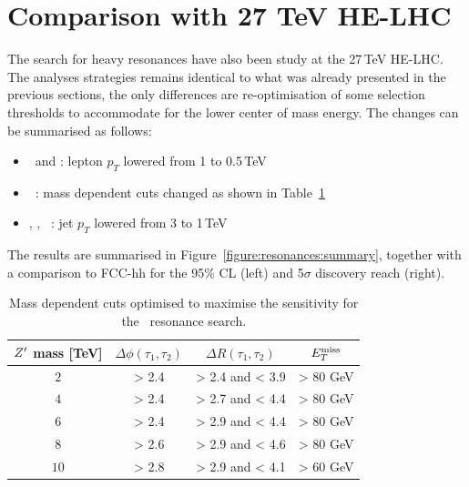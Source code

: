 \documentclass[a4paper,11pt]{article}
\begin{document}
\section{Comparison with 27 TeV HE-LHC}
\label{sec:ana27tev}
The search for heavy resonances have also been study at the 27\,TeV HE-LHC. The analyses strategies remains identical to what was already presented in the previous sections, the only differences are re-optimisation of some selection thresholds to accommodate for the lower center of mass energy. The changes can be summarised as follows:
\begin{itemize}
\item \Zpee\ and \Zpmumu : lepton $p_T$ lowered from 1 to 0.5\,TeV
\item \Zptata\ : mass dependent cuts changed as shown in Table~\ref{tab:leptonicresonances:tautau27}
\item \rsg, \Zptt, \qjj\ : jet $p_T$ lowered from 3 to 1\,TeV
\end{itemize}
The results are summarised in Figure~\ref{figure:resonances:summary}, together with a comparison to FCC-hh for the 95\% CL (left) and 5$\sigma$ discovery reach (right).

\begin{table}[!htb]
   \centering
\begin{tabular}{c|c|c|c}
   $Z^{\prime}$ mass [TeV] &  $\Delta \phi(\tau_1, \tau_2)$&  $\Delta R(\tau_1, \tau_2)$ & $E_{T}^{\rm{miss}}$\\
  \hline
  \hline
   $2$ & > 2.4 & > 2.4 and < 3.9 & > 80 GeV\\
   $4$ & > 2.4 & > 2.7 and < 4.4 & > 80 GeV\\
   $6$ & > 2.4 & > 2.9 and < 4.4 & > 80 GeV\\
   $8$ & > 2.6 & > 2.9 and < 4.6 & > 80 GeV\\
  $10$ & > 2.8 & > 2.9 and < 4.1 & > 60 GeV\\
  \end{tabular}
  \caption{Mass dependent cuts optimised to maximise the sensitivity for the \Zptata\ resonance search.}
  \label{tab:leptonicresonances:tautau27}
\end{table}
\end{document}
